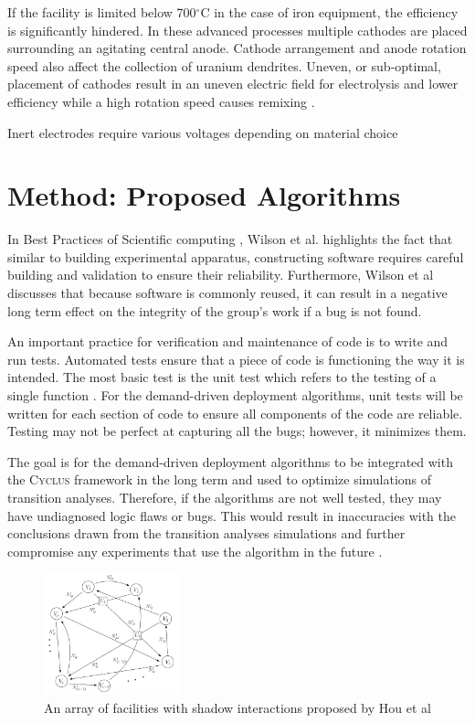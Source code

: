 \documentclass{anstrans}
\newcommand{\Cyclus}{\textsc{Cyclus}\xspace}%
\begin{document}
If the facility is limited below 700$^{\circ}$C in the case of iron equipment, the efficiency is significantly hindered. In these advanced processes multiple cathodes are placed surrounding an agitating central anode. Cathode arrangement and anode rotation speed also affect the collection of uranium dendrites. Uneven, or sub-optimal, placement of cathodes result in an uneven electric field for electrolysis and lower efficiency while a high rotation speed causes remixing \cite{lee_advanced_nodate}.

Inert electrodes require various voltages depending on material choice 
\section{Method: Proposed Algorithms}
In Best Practices of Scientific computing \cite{wilson_best_2014}, Wilson et 
al. highlights the fact that similar to building experimental apparatus, 
constructing software requires careful building and validation to ensure their 
reliability. Furthermore, Wilson et al discusses that because software is 
commonly reused, it can result in a negative long term effect on the integrity 
of the group's work if a bug is not found. 

An important practice for verification and maintenance of code is to write and 
run tests. Automated tests ensure that a piece of code 
is functioning the way it is intended. The most basic test is the unit test 
which refers to the testing of a single function \cite{wilson_best_2014}. For 
the demand-driven deployment algorithms, unit tests will be written for each 
section of code to ensure all components of the code are reliable. Testing may 
not be perfect at capturing all the bugs; however, it minimizes them. 

The goal is for the demand-driven deployment algorithms to be integrated with 
the \Cyclus framework in the long term and used to optimize simulations of 
transition analyses. Therefore, if the algorithms are not well tested, they may 
have undiagnosed logic flaws or bugs. This would result in inaccuracies with 
the conclusions drawn from the transition analyses simulations and further 
compromise any experiments that use the algorithm in the future 
\cite{wilson_best_2014}.    

\begin{figure}[ht] %
	\centering
	\includegraphics[width=0.35\textwidth]{Hou_Network}
	\caption{An array of facilities with shadow interactions proposed by Hou et al\cite{Hou_2016}}
	\label{fig:maximumlikelihood}
\end{figure}
\end{document}
